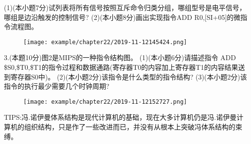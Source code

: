 (1)(本小题7分)试列表将所有信号按照互斥命令归类分组，哪组型号是电平信号，哪组是边沿触发的控制信号?\newline
(2)(本小题8分)画出实现指令ADD  R0,[SI+05]的微指令流程图。\newline
\begin{figure}[H]
	\centering  %
	\texttt{[image: example/chapter22/2019-11-12145424.png]}
\end{figure}
3.(本题10分)图2是MIPS的一种指令结构图。\newline
(1)(本小题6分)请描述指令 ADD \$S0,\$T0,\$T1的指令过程和数据通路(寄存器T0的内容加上寄存器T1的内容结果送到寄存器S0中)。\newline
(2)(本小题2分)该指令是什么类型的指令结构?\newline
(3)(本小题2分)该指令的执行最少需要几个时钟周期?\newline
\begin{figure}[H]
	\centering  %
	\texttt{[image: example/chapter22/2019-11-12152727.png]}
\end{figure}



TIPS:冯.诺伊曼体系结构是现代计算机的基础，现在大多计算机仍是冯.诺伊曼计算机的组织结构，只是作了一些改进而已，并没有从根本上突破冯体系结构的束缚。

